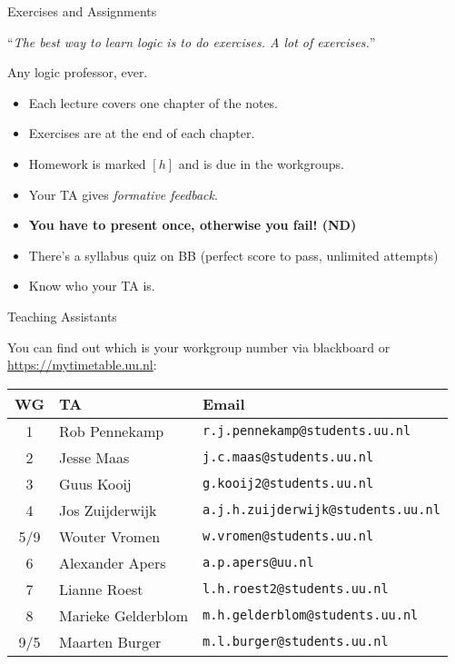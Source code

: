 \begin{frame}{Exercises and Assignments}

``{\it The best way to learn logic is to do exercises. A lot of exercises.}''
\begin{flushright}
Any logic professor, ever.
\end{flushright}

	\begin{itemize}[<+->]
	
		\item Each lecture covers one chapter of the notes.
		
		\item Exercises are at the end of each chapter.
		
		\item Homework is marked $[h]$ and is due in the workgroups.
		
		\item Your TA gives \emph{formative feedback}.
		
		\item \textbf{You have to present once, otherwise you fail! (ND)}
		
		\item There's a syllabus quiz on BB (perfect score to pass, unlimited attempts)
		
		\item Know who your TA is.
	
	\end{itemize}

\end{frame}

\begin{frame}{Teaching Assistants}

You can find out which is your workgroup number via blackboard or \url{https://mytimetable.uu.nl}:
{\small \begin{center}
\begin{tabular}{| c | l | l |}
\hline
\textbf{WG} & \textbf{TA} & \textbf{Email}\\\hline
 1& Rob Pennekamp& \texttt{r.j.pennekamp@students.uu.nl}\\
 2& Jesse Maas& \texttt{j.c.maas@students.uu.nl}\\
 3& Guus Kooij& \texttt{g.kooij2@students.uu.nl}\\
 4& Jos Zuijderwijk& \texttt{a.j.h.zuijderwijk@students.uu.nl}\\
 5/9& Wouter Vromen& \texttt{w.vromen@students.uu.nl}\\
 6& Alexander Apers& \texttt{a.p.apers@uu.nl}\\
 7&Lianne Roest& \texttt{l.h.roest2@students.uu.nl}\\
 8& Marieke Gelderblom& \texttt{m.h.gelderblom@students.uu.nl}\\
 9/5& Maarten Burger& \texttt{m.l.burger@students.uu.nl}\\\hline
\end{tabular}
\end{center}}


\end{frame}

